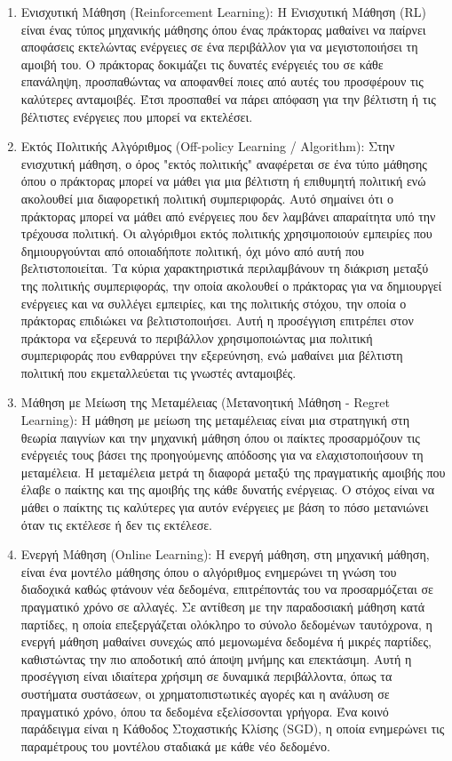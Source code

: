 \begin{enumerate}
    \item Ενισχυτική Μάθηση (Reinforcement Learning): Η Ενισχυτική Μάθηση (RL) είναι ένας τύπος μηχανικής μάθησης όπου ένας πράκτορας μαθαίνει να παίρνει αποφάσεις εκτελώντας ενέργειες σε ένα περιβάλλον για να μεγιστοποιήσει τη αμοιβή του. Ο πράκτορας δοκιμάζει τις δυνατές ενέργειές του σε κάθε επανάληψη, προσπαθώντας να αποφανθεί ποιες από αυτές του προσφέρουν τις καλύτερες ανταμοιβές. Έτσι προσπαθεί να πάρει απόφαση για την βέλτιστη ή τις βέλτιστες ενέργειες που μπορεί να εκτελέσει. 

    \item Εκτός Πολιτικής Αλγόριθμος (Off-policy Learning / Algorithm): Στην ενισχυτική μάθηση, ο όρος "εκτός πολιτικής" αναφέρεται σε ένα τύπο μάθησης όπου ο πράκτορας μπορεί να μάθει για μια βέλτιστη ή επιθυμητή πολιτική ενώ ακολουθεί μια διαφορετική πολιτική συμπεριφοράς. Αυτό σημαίνει ότι ο πράκτορας μπορεί να μάθει από ενέργειες που δεν λαμβάνει απαραίτητα υπό την τρέχουσα πολιτική. Οι αλγόριθμοι εκτός πολιτικής χρησιμοποιούν εμπειρίες που δημιουργούνται από οποιαδήποτε πολιτική, όχι μόνο από αυτή που βελτιστοποιείται. Τα κύρια χαρακτηριστικά περιλαμβάνουν τη διάκριση μεταξύ της πολιτικής συμπεριφοράς, την οποία ακολουθεί ο πράκτορας για να δημιουργεί ενέργειες και να συλλέγει εμπειρίες, και της πολιτικής στόχου, την οποία ο πράκτορας επιδιώκει να βελτιστοποιήσει. Αυτή η προσέγγιση επιτρέπει στον πράκτορα να εξερευνά το περιβάλλον χρησιμοποιώντας μια πολιτική συμπεριφοράς που ενθαρρύνει την εξερεύνηση, ενώ μαθαίνει μια βέλτιστη πολιτική που εκμεταλλεύεται τις γνωστές ανταμοιβές. 

    \item Μάθηση με Μείωση της Μεταμέλειας (Μετανοητική Μάθηση - Regret Learning): Η μάθηση με μείωση της μεταμέλειας είναι μια στρατηγική στη θεωρία παιγνίων και την μηχανική μάθηση όπου οι παίκτες προσαρμόζουν τις ενέργειές τους βάσει της προηγούμενης απόδοσης για να ελαχιστοποιήσουν τη μεταμέλεια. Η μεταμέλεια μετρά τη διαφορά μεταξύ της πραγματικής αμοιβής που έλαβε ο παίκτης και της αμοιβής της κάθε δυνατής ενέργειας. Ο στόχος είναι να μάθει ο παίκτης τις καλύτερες για αυτόν ενέργειες με βάση το πόσο μετανιώνει όταν τις εκτέλεσε ή δεν τις εκτέλεσε. 

    \item Ενεργή Μάθηση (Online Learning): Η ενεργή μάθηση, στη μηχανική μάθηση, είναι ένα μοντέλο μάθησης όπου ο αλγόριθμος ενημερώνει τη γνώση του διαδοχικά καθώς φτάνουν νέα δεδομένα, επιτρέποντάς του να προσαρμόζεται σε πραγματικό χρόνο σε αλλαγές. Σε αντίθεση με την παραδοσιακή μάθηση κατά παρτίδες, η οποία επεξεργάζεται ολόκληρο το σύνολο δεδομένων ταυτόχρονα, η ενεργή μάθηση μαθαίνει συνεχώς από μεμονωμένα δεδομένα ή μικρές παρτίδες, καθιστώντας την πιο αποδοτική από άποψη μνήμης και επεκτάσιμη. Αυτή η προσέγγιση είναι ιδιαίτερα χρήσιμη σε δυναμικά περιβάλλοντα, όπως τα συστήματα συστάσεων, οι χρηματοπιστωτικές αγορές και η ανάλυση σε πραγματικό χρόνο, όπου τα δεδομένα εξελίσσονται γρήγορα. Ένα κοινό παράδειγμα είναι η Κάθοδος Στοχαστικής Κλίσης (SGD), η οποία ενημερώνει τις παραμέτρους του μοντέλου σταδιακά με κάθε νέο δεδομένο. 


\end{enumerate}
